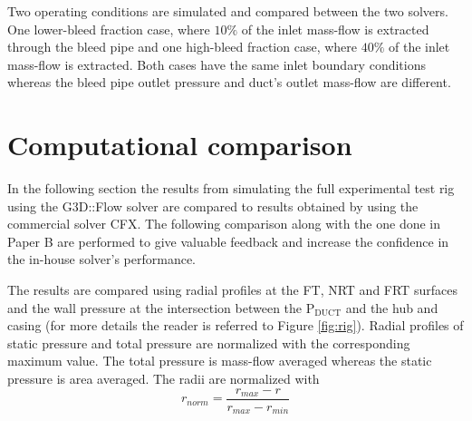 Two operating conditions are simulated and compared between the two solvers. One lower-bleed fraction case, where $10\%$ of the inlet mass-flow is extracted through the bleed pipe and one high-bleed fraction case, where $40\%$ of the inlet mass-flow is extracted. Both cases have the same inlet boundary conditions whereas the bleed pipe outlet pressure and duct's outlet mass-flow are different.


\section{Computational comparison}
In the following section the results from simulating the full experimental test rig using the G3D::Flow solver are compared to results obtained by using the commercial solver CFX. The following comparison along with the one done in Paper B are performed to give valuable feedback and increase the confidence in the in-house solver's performance.

The results are compared using radial profiles at the FT, NRT and FRT surfaces and the wall pressure at the intersection between the P$_\text{DUCT}$ and the hub and casing (for more details the reader is referred to Figure \ref{fig:rig}). Radial profiles of static pressure and total pressure are normalized with the corresponding maximum value. The total pressure is mass-flow averaged whereas the static pressure is area averaged. The radii are normalized with 
\begin{equation*}
  r_{norm} = \frac{r_{max}-r}{r_{max}-r_{min}}
\end{equation*}

